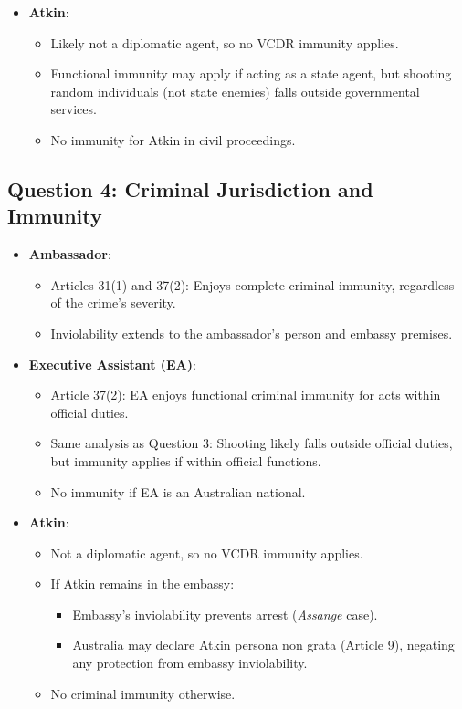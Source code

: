 \begin{itemize}
\begin{itemize}
\begin{itemize}
        \end{itemize}
    \end{itemize}
    \item \textbf{Atkin}:
    \begin{itemize}
        \item Likely not a diplomatic agent, so no VCDR immunity applies.
        \item Functional immunity may apply if acting as a state agent, but shooting random individuals (not state enemies) falls outside governmental services.
        \item No immunity for Atkin in civil proceedings.
    \end{itemize}
\end{itemize}

\subsection{Question 4: Criminal Jurisdiction and Immunity}
\begin{itemize}
    \item \textbf{Ambassador}:
    \begin{itemize}
        \item Articles 31(1) and 37(2): Enjoys complete criminal immunity, regardless of the crime’s severity.
        \item Inviolability extends to the ambassador’s person and embassy premises.
    \end{itemize}
    \item \textbf{Executive Assistant (EA)}:
    \begin{itemize}
        \item Article 37(2): EA enjoys functional criminal immunity for acts within official duties.
        \item Same analysis as Question 3: Shooting likely falls outside official duties, but immunity applies if within official functions.
        \item No immunity if EA is an Australian national.
    \end{itemize}
    \item \textbf{Atkin}:
    \begin{itemize}
        \item Not a diplomatic agent, so no VCDR immunity applies.
        \item If Atkin remains in the embassy:
        \begin{itemize}
            \item Embassy’s inviolability prevents arrest (\textit{Assange} case).
            \item Australia may declare Atkin persona non grata (Article 9), negating any protection from embassy inviolability.
        \end{itemize}
        \item No criminal immunity otherwise.
    \end{itemize}
\end{itemize}

